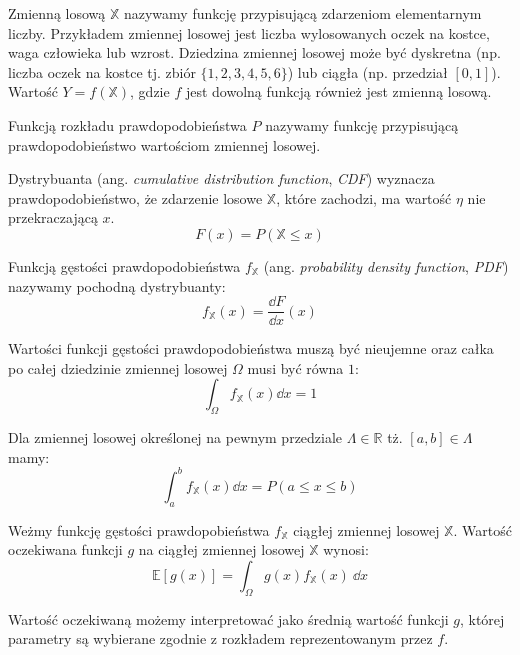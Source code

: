 \documentclass[../main.tex]{subfiles}
\begin{document}
Zmienną losową $\mathbb{X}$ nazywamy funkcję przypisującą zdarzeniom elementarnym liczby. Przykładem zmiennej losowej jest liczba wylosowanych oczek na kostce, waga człowieka lub wzrost. Dziedzina zmiennej losowej może być dyskretna (np. liczba oczek na kostce tj. zbiór $\{1,2,3,4,5,6\}$) lub ciągła (np. przedział $[0,1]$). Wartość $Y = f(\mathbb{X})$, gdzie $f$ jest dowolną funkcją również jest zmienną losową. 

Funkcją rozkładu prawdopodobieństwa $P$ nazywamy funkcję przypisującą prawdopodobieństwo wartościom zmiennej losowej. 

Dystrybuanta (ang. \textit{cumulative distribution function}, \textit{CDF}) wyznacza prawdopodobieństwo, że zdarzenie losowe $\mathbb{X}$, które zachodzi, ma wartość $\eta$ nie przekraczającą $x$.
\begin{equation}
    F(x) = P(\mathbb{X} \leq x)
\end{equation}

Funkcją gęstości prawdopodobieństwa $f_{\mathbb{X}}$ (ang. \textit{probability density function}, \textit{PDF}) nazywamy pochodną dystrybuanty:
\begin{equation}
    f_{\mathbb{X}}(x) = \frac{\dd F}{\dd x}(x)
\end{equation}

Wartości funkcji gęstości prawdopodobieństwa muszą być nieujemne oraz całka po całej dziedzinie zmiennej losowej $\Omega$ musi być równa $1$:
\begin{equation}
    \int_{\Omega} f_{\mathbb{X}}(x) \dd x = 1
\end{equation}

Dla zmiennej losowej określonej na pewnym przedziale $\Lambda \in \mathbb{R}$ tż. $[a,b] \in \Lambda$ mamy:
\begin{equation}
    \int_{a}^{b} f_{\mathbb{X}}(x) \dd x = P(a \leq x \leq b)
\end{equation}

Weżmy funkcję gęstości prawdopobieństwa $f_{\mathbb{X}}$ ciągłej zmiennej losowej $\mathbb{X}$. Wartość oczekiwana funkcji $g$ na ciągłej zmiennej losowej $\mathbb{X}$ wynosi:
\begin{equation}
\mathbb{E}\left[ g(x) \right] =
\int_{\Omega}{
	g(x) f_{\mathbb{X}}(x)
	\: \dd x
}
\end{equation}

Wartość oczekiwaną możemy interpretować jako średnią wartość funkcji $g$, której parametry są wybierane zgodnie z rozkładem reprezentowanym przez $f$.
\end{document}
